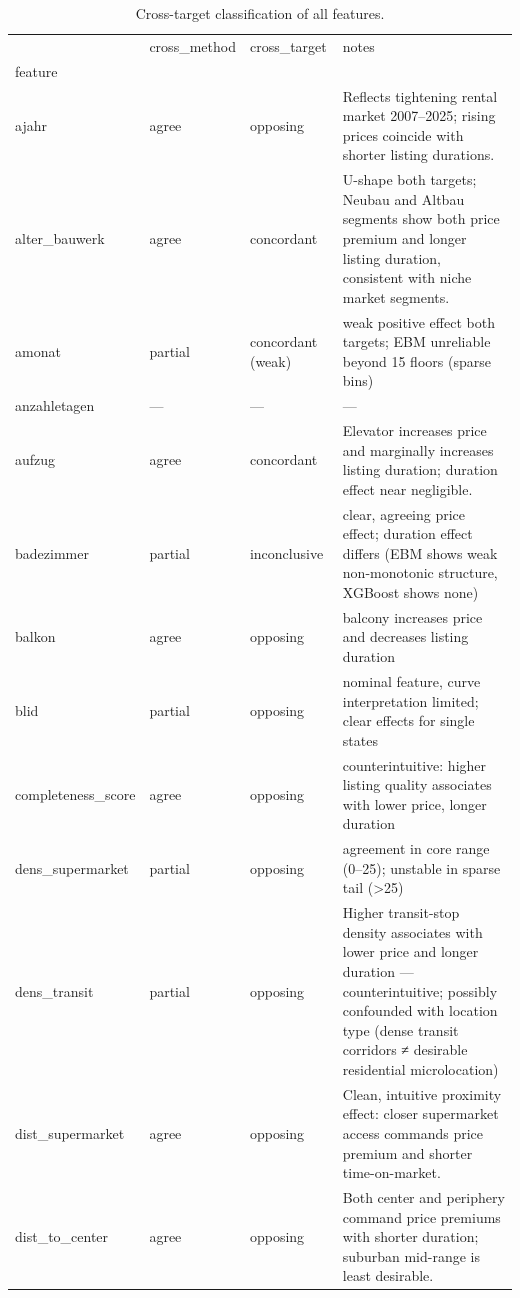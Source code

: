 \begin{table}
\caption{Cross-target classification of all features.}
\label{tab:classification}
\begin{tabular}{lll}
\toprule
 & cross_method & cross_target & notes \\
feature &  &  &  \\
\midrule
ajahr & agree & opposing & Reflects tightening rental market 2007–2025; rising prices coincide with shorter listing durations. \\
alter_bauwerk & agree & concordant & U-shape both targets; Neubau and Altbau segments show both price premium and longer listing duration, consistent with niche market segments. \\
amonat & partial & concordant (weak) & weak positive effect both targets; EBM unreliable beyond 15 floors (sparse bins) \\
anzahletagen & — & — & — \\
aufzug & agree & concordant & Elevator increases price and marginally increases listing duration; duration effect near negligible. \\
badezimmer & partial & inconclusive & clear, agreeing price effect; duration effect differs (EBM shows weak non-monotonic structure, XGBoost shows none) \\
balkon & agree & opposing & balcony increases price and decreases listing duration \\
blid & partial & opposing & nominal feature, curve interpretation limited; clear effects for single states \\
completeness_score & agree & opposing & counterintuitive: higher listing quality associates with lower price, longer duration \\
dens_supermarket & partial & opposing & agreement in core range (0–25); unstable in sparse tail (>25) \\
dens_transit & partial & opposing & Higher transit-stop density associates with lower price and longer duration — counterintuitive; possibly confounded with location type (dense transit corridors ≠ desirable residential microlocation) \\
dist_supermarket & agree & opposing & Clean, intuitive proximity effect: closer supermarket access commands price premium and shorter time-on-market. \\
dist_to_center & agree & opposing & Both center and periphery command price premiums with shorter duration; suburban mid-range is least desirable. \\

\end{tabular}
\end{table}
